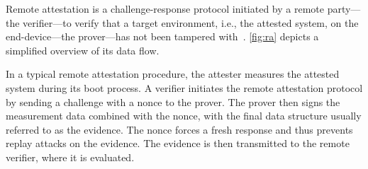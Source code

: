 




Remote attestation is a challenge-response protocol initiated by a remote party---the verifier---to verify that a target environment, i.e., the attested system, on the end-device---the prover---has not been tampered with~\cite{Menetrey2022, Coker2011}.
\autoref{fig:ra} depicts a simplified overview of its data flow.

In a typical remote attestation procedure, the attester measures the attested system during its boot process.
A verifier initiates the remote attestation protocol by sending a challenge with a nonce to the prover.
The prover then signs the measurement data combined with the nonce, with the final data structure usually referred to as the evidence.
The nonce forces a fresh response and thus prevents replay attacks on the evidence.
The evidence is then transmitted to the remote verifier, where it is evaluated.


